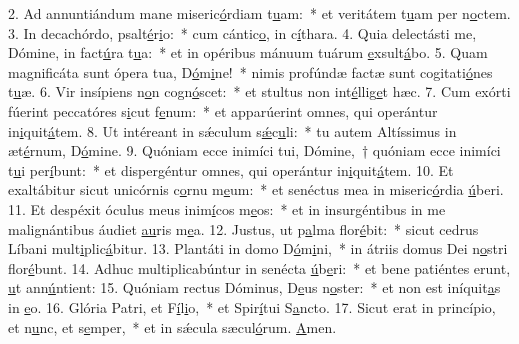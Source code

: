 2. Ad annuntiándum mane miseric\uline{ó}rdiam t\uline{u}am:~* et veritátem t\uline{u}am per n\uline{o}ctem.
3. In decachórdo, psalt\uline{é}r\uline{i}o:~* cum cántic\uline{o}, in c\uline{í}thara.
4. Quia delectásti me, Dómine, in fact\uline{ú}ra t\uline{u}a:~* et in opéribus mánuum tuárum \uline{e}xsult\uline{á}bo.
5. Quam magnificáta sunt ópera tua, D\uline{ó}m\uline{i}ne!~* nimis profúndæ factæ sunt cogitati\uline{ó}nes t\uline{u}æ.
6. Vir insípiens n\uline{o}n cogn\uline{ó}scet:~* et stultus non int\uline{é}llig\uline{e}t hæc.
7. Cum exórti fúerint peccatóres s\uline{i}cut f\uline{e}num:~* et apparúerint omnes, qui operántur in\uline{i}quit\uline{á}tem.
8. Ut intéreant in sǽculum s\uline{ǽ}c\uline{u}li:~* tu autem Altíssimus in æt\uline{é}rnum, D\uline{ó}mine.
9. Quóniam ecce inimíci tui, Dómine,~† quóniam ecce inimíci t\uline{u}i per\uline{í}bunt:~* et dispergéntur omnes, qui operántur in\uline{i}quit\uline{á}tem.
10. Et exaltábitur sicut unicórnis c\uline{o}rnu m\uline{e}um:~* et senéctus mea in miseric\uline{ó}rdia \uline{ú}beri.
11. Et despéxit óculus meus inim\uline{í}cos m\uline{e}os:~* et in insurgéntibus in me malignántibus áudiet \uline{au}ris m\uline{e}a.
12. Justus, ut p\uline{a}lma flor\uline{é}bit:~* sicut cedrus Líbani mult\uline{i}plic\uline{á}bitur.
13. Plantáti in domo D\uline{ó}m\uline{i}ni,~* in átriis domus Dei n\uline{o}stri flor\uline{é}bunt.
14. Adhuc multiplicabúntur in senécta \uline{ú}b\uline{e}ri:~* et bene patiéntes erunt, \uline{u}t ann\uline{ú}ntient:
15. Quóniam rectus Dóminus, D\uline{e}us n\uline{o}ster:~* et non est iníquit\uline{a}s in \uline{e}o.
16. Glória Patri, et F\uline{í}l\uline{i}o,~* et Spir\uline{í}tui S\uline{a}ncto.
17. Sicut erat in princípio, et n\uline{u}nc, et s\uline{e}mper,~* et in sǽcula sæcul\uline{ó}rum. \uline{A}men.
